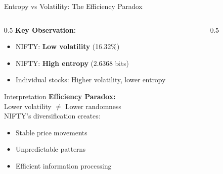 \documentclass[aspectratio=169,12pt,xcolor=table]{beamer}
\begin{document}
\begin{frame}{Entropy vs Volatility: The Efficiency Paradox}
\begin{columns}[T]
\begin{column}{0.5\textwidth}
    \textbf{Key Observation:}
    \begin{itemize}
        \item NIFTY: \textcolor{niftygreen}{\textbf{Low volatility}} (16.32\%)
        \item NIFTY: \textcolor{niftyblue}{\textbf{High entropy}} (2.6368 bits)
        \item Individual stocks: Higher volatility, lower entropy
    \end{itemize}
    
    \vspace{0.3cm}
    \begin{block}{Interpretation}
        \textbf{Efficiency Paradox:} \\
        Lower volatility $\neq$ Lower randomness \\
        \vspace{0.2cm}
        NIFTY's diversification creates:
        \begin{itemize}
            \item Stable price movements
            \item Unpredictable patterns
            \item Efficient information processing
        \end{itemize}
    \end{block}
\end{column}

\begin{column}{0.5\textwidth}
    \begin{center}
    \end{center}
    

\end{column}
\end{columns}
\end{frame}
\end{document}

